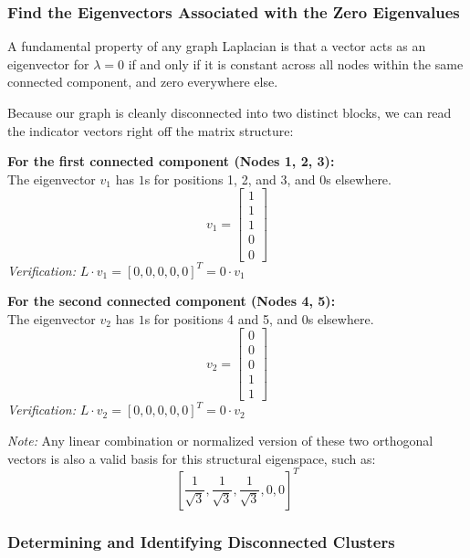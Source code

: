 \documentclass[twoside, 10pt]{article}
\begin{document}
\subsubsection{Find the Eigenvectors Associated with the Zero Eigenvalues} %
A fundamental property of any graph Laplacian is that a vector acts as an eigenvector for $\lambda = 0$ if and only if it is constant across all nodes within the same connected component, and zero everywhere else.

Because our graph is cleanly disconnected into two distinct blocks, we can read the indicator vectors right off the matrix structure:

\textbf{For the first connected component (Nodes 1, 2, 3):} \\
The eigenvector $v_1$ has $1$s for positions 1, 2, and 3, and $0$s elsewhere.
\begin{equation*}
v_1 = \begin{bmatrix} 1 \\ 1 \\ 1 \\ 0 \\ 0 \end{bmatrix}
\end{equation*}
\textit{Verification:} $L \cdot v_1 = [0, 0, 0, 0, 0]^T = 0 \cdot v_1$

\textbf{For the second connected component (Nodes 4, 5):} \\
The eigenvector $v_2$ has $1$s for positions 4 and 5, and $0$s elsewhere.
\begin{equation*}
v_2 = \begin{bmatrix} 0 \\ 0 \\ 0 \\ 1 \\ 1 \end{bmatrix}
\end{equation*}
\textit{Verification:} $L \cdot v_2 = [0, 0, 0, 0, 0]^T = 0 \cdot v_2$

\noindent \textit{Note:} Any linear combination or normalized version of these two orthogonal vectors is also a valid basis for this structural eigenspace, such as:
\begin{equation*}
{\left[\frac{1}{\sqrt{3}},\frac{1}{\sqrt{3}},\frac{1}{\sqrt{3}},0,0\right]}^{T}
\end{equation*}

\subsubsection{Determining and Identifying Disconnected Clusters} 
\end{document}
